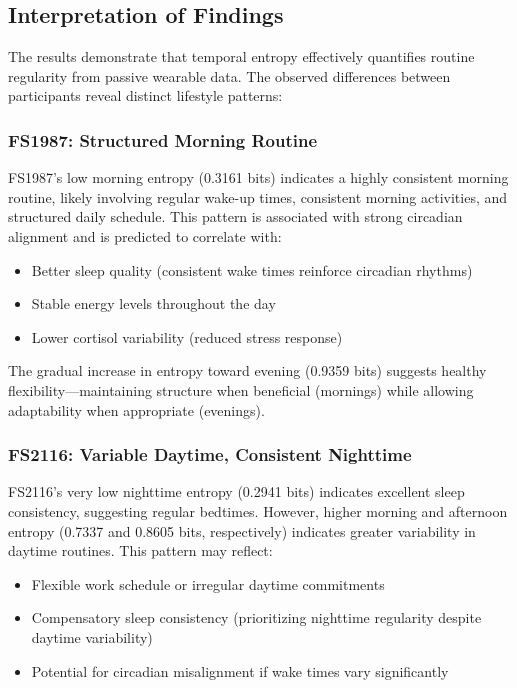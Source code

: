 \documentclass[12pt,letterpaper]{article}
\begin{document}
\subsection{Interpretation of Findings}

The results demonstrate that temporal entropy effectively quantifies routine regularity from passive wearable data. The observed differences between participants reveal distinct lifestyle patterns:

\subsubsection{FS1987: Structured Morning Routine}

FS1987's low morning entropy (0.3161 bits) indicates a highly consistent morning routine, likely involving regular wake-up times, consistent morning activities, and structured daily schedule. This pattern is associated with strong circadian alignment and is predicted to correlate with:
\begin{itemize}
    \item Better sleep quality (consistent wake times reinforce circadian rhythms)
    \item Stable energy levels throughout the day
    \item Lower cortisol variability (reduced stress response)
\end{itemize}

The gradual increase in entropy toward evening (0.9359 bits) suggests healthy flexibility—maintaining structure when beneficial (mornings) while allowing adaptability when appropriate (evenings).

\subsubsection{FS2116: Variable Daytime, Consistent Nighttime}

FS2116's very low nighttime entropy (0.2941 bits) indicates excellent sleep consistency, suggesting regular bedtimes. However, higher morning and afternoon entropy (0.7337 and 0.8605 bits, respectively) indicates greater variability in daytime routines. This pattern may reflect:
\begin{itemize}
    \item Flexible work schedule or irregular daytime commitments
    \item Compensatory sleep consistency (prioritizing nighttime regularity despite daytime variability)
    \item Potential for circadian misalignment if wake times vary significantly
\end{itemize}
\end{document}
